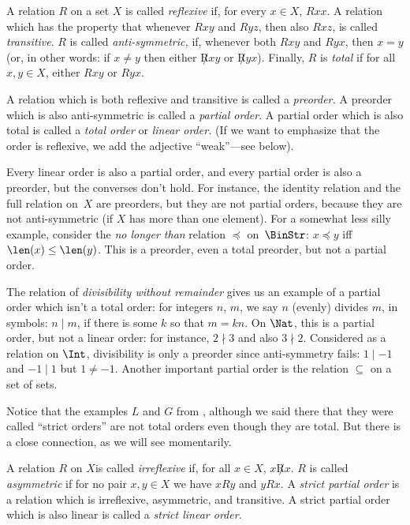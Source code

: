 \documentclass[../../include/open-logic-section]{subfiles}
\begin{document}

\begin{defn}
A relation $R$ on a set $X$ is called \emph{reflexive} if, for every
$x\in X$, $Rxx$. A relation which has the property that whenever $Rxy$
and $Ryz$, then also $Rxz$, is called \emph{transitive}.  $R$ is
called \emph{anti-symmetric,} if, whenever both $Rxy$ and $Ryx$, then
$x=y$ (or, in other words: if $x\neq y$ then either $\not Rxy$ or
$\not Ryx$). Finally, $R$ is \emph{total} if for all $x,y\in X$,
either $Rxy$ or $Ryx$.

A relation which is both reflexive and transitive is called a
\emph{preorder.}  A preorder which is also anti-symmetric is called a
\emph{partial order}. A partial order which is also total is called a
\emph{total order} or \emph{linear order.} (If we want to emphasize
that the order is reflexive, we add the adjective ``weak''---see
below).
\end{defn}

\begin{ex}
Every linear order is also a partial order, and every partial order is
also a preorder, but the converses don't hold. For instance, the
identity relation and the full relation on~$X$ are preorders, but they
are not partial orders, because they are not anti-symmetric (if $X$
has more than one element). For a somewhat less silly example,
consider the \emph{no longer than} relation $\preccurlyeq$
on~$\BinStr$: $x\preccurlyeq y$ iff $\len(x)\le\len(y)$. This is a
preorder, even a total preorder, but not a partial order.

The relation of \emph{divisibility without remainder} gives us an
example of a partial order which isn't a total order: for integers
$n$, $m$, we say $n$ (evenly) divides $m$, in symbols: $n\mid m$, if
there is some $k$ so that $m=kn$.  On $\Nat$, this is a partial order,
but not a linear order: for instance, $2\nmid3$ and also
$3\nmid2$. Considered as a relation on $\Int$, divisibility is only a
preorder since anti-symmetry fails: $1\mid-1$ and $-1\mid1$ but
$1\neq-1$. Another important partial order is the relation $\subseteq$
on a set of sets.

Notice that the examples $L$ and $G$ from ,
although we said there that they were called ``strict orders'' are not
total orders even though they are total. But there is a close
connection, as we will see momentarily.
\end{ex}

\begin{defn}
A relation $R$ on $X$is called \emph{irreflexive} if, for all $x\in
X$, $x\not Rx$. $R$ is called \emph{asymmetric} if for no pair $x,y\in
X$ we have $xRy$ and $yRx$. A \emph{strict partial order} is a
relation which is irreflexive, asymmetric, and transitive. A strict
partial order which is also linear is called a \emph{strict linear
  order.}
\end{defn}
\end{document}
